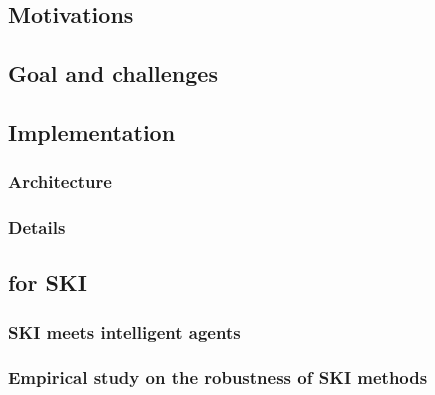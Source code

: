 
\chapter[Platform for symbolic knowledge injection]{}
\label{ch:psyki}
\minitoc

\section{Motivations}\label{sec:psyki-motivations}

\section{Goal and challenges}\label{sec:psyki-goal-and-challenges}

\section{Implementation}\label{sec:implementation}

\subsection{Architecture}\label{subsec:architecture}

\subsection{Details}\label{subsec:details}

\section[Quality of service for SKI]{ for \Gls{SKI}}\label{sec:qos}

\subsection[SKI meets intelligent agents]{\Gls{SKI} meets intelligent agents}\label{subsec:ski-meets-intelligent-agents}
%

\subsection[Empirical study on the robustness of SKI methods]{Empirical study on the robustness of \Gls{SKI} methods}\label{subsec:empirical-study-on-the-robustness-of-ski-methods}
%
